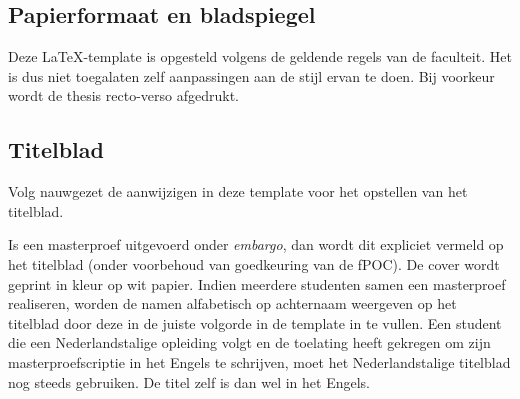 \subsection{Papierformaat en bladspiegel}
Deze LaTeX-template is opgesteld volgens de geldende regels van de faculteit. Het is dus niet toegalaten zelf aanpassingen aan de stijl ervan te doen. Bij voorkeur wordt de thesis recto-verso afgedrukt.

\subsection{Titelblad}
Volg nauwgezet de aanwijzigen in deze template voor het opstellen van het titelblad.

Is een masterproef uitgevoerd onder \textit{embargo}, dan wordt dit expliciet vermeld op het titelblad (onder voorbehoud van goedkeuring van de fPOC). De cover wordt geprint in kleur op wit papier. Indien meerdere studenten samen een masterproef realiseren, worden de namen alfabetisch op achternaam weergeven op het titelblad door deze in de juiste volgorde in de template in te vullen. Een student die een Nederlandstalige opleiding volgt en de toelating heeft gekregen om zijn masterproefscriptie in het Engels te schrijven, moet het Nederlandstalige titelblad nog steeds gebruiken. De titel zelf is dan wel in het Engels.
